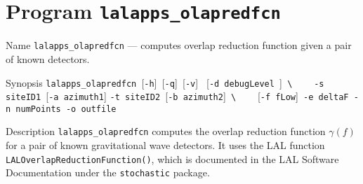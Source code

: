 
\section{Program \texttt{lalapps\_olapredfcn}}
\label{program:lalapps-olapredfcn}

\begin{entry}

\item[Name]
%
  \verb$lalapps_olapredfcn$ --- computes overlap reduction function given
  a pair of known detectors.

\item[Synopsis]
%
  \verb$lalapps_olapredfcn $[\verb$-h$]\verb$ $[\verb$-q$]\verb$ $[\verb$-v$]
  \verb$ $[\verb$-d debugLevel $]\verb+ \+\newline
  \verb$   $
  \verb$-s siteID1 $[\verb$-a azimuth1$]
  \verb$-t siteID2 $[\verb$-b azimuth2$]\verb+ \+\newline
  \verb$   $
  [\verb$-f fLow$]\verb$ -e deltaF$\verb$ -n numPoints$\verb$ -o outfile$
                         
\item[Description]
%
  \verb$lalapps_olapredfcn$ computes the overlap reduction function
  $\gamma(f)$ for a pair of known gravitational wave detectors.  It
  uses the LAL function \verb$LALOverlapReductionFunction()$, which is
  documented in the LAL Software Documentation under the
  \texttt{stochastic} package.


\end{entry}
